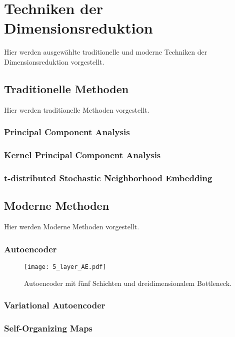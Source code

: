 \chapter{Techniken der Dimensionsreduktion}
\label{ch:TechnikenDerDimRed}


Hier werden ausgewählte traditionelle und moderne Techniken der Dimensionsreduktion vorgestellt.

\section{Traditionelle Methoden}
\label{ch:TechnikenDerDimRed:sec:TraditionelleMethoden}

Hier werden traditionelle Methoden vorgestellt.


\newpage

\subsection{Principal Component Analysis}
\label{ch:TechnikenDerDimRed:sec:TradtionelleMethoden:subsec:PCA}


\subsection{Kernel Principal Component Analysis}
\label{ch:TechnikenDerDimRed:sec:TradtionelleMethoden:subsec:kPCA}

\subsection{t-distributed Stochastic Neighborhood Embedding}
\label{ch:TechnikenDerDimRed:sec:TradtionelleMethoden:subsec:t-SNE}

\newpage


\section{Moderne Methoden}
\label{ch:TechnikenDerDimRed:sec:ModerneMethoden}

Hier werden Moderne Methoden vorgestellt.

\subsection{Autoencoder}
\label{ch:TechnikenDerDimRed:sec:ModerneMethoden:subsec:AE}

\begin{figure}[h]
  \begin{center}
    \texttt{[image: 5\_layer\_AE.pdf]}
    \caption{Autoencoder mit fünf Schichten und dreidimensionalem Bottleneck.}
  \end{center}
\end{figure}

\subsection{Variational Autoencoder}
\label{ch:TechnikenDerDimRed:sec:ModerneMethoden:subsec:VAE}

\subsection{Self-Organizing Maps}
\label{ch:TechnikenDerDimRed:sec:ModerneMethoden:subsec:SOM}
